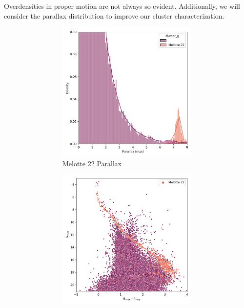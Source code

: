 \documentclass[11pt, a4paper, english]{book}
\begin{document}
Overdensities in proper motion are not always so evident.
Additionally, we will consider the parallax distribution to improve our cluster characterization.

\begin{figure}[htbp]
  \centering
  \begin{subfigure}{0.9\textwidth}
    \centering
    \begin{subfigure}[t]{0.45\textwidth}
      \centering
      \includegraphics[width=\textwidth]{../figures/melotte_22/parallax_zoom_melotte_22.png}
      \caption{Melotte 22 Parallax}
      \label{fig:melotte_22_parallax_zoom}
    \end{subfigure}
    \hfill
    \begin{subfigure}[t]{0.45\textwidth}
      \centering
      \includegraphics[width=\textwidth]{../figures/melotte_22/hr_diagram_melotte_22.png}

\end{subfigure}
\end{subfigure}
\end{figure}
\end{document}
